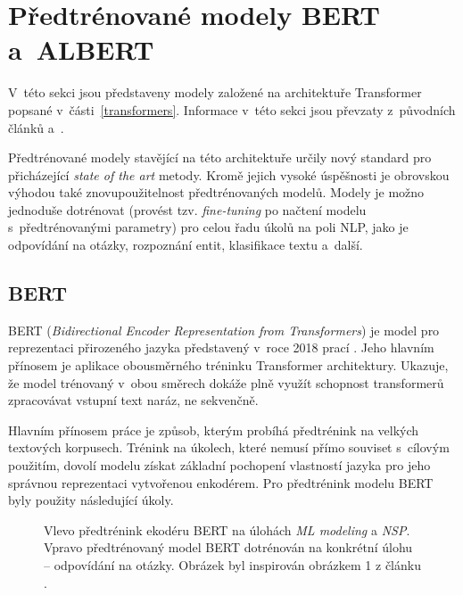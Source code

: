 \section{Předtrénované modely BERT a~ALBERT}
\label{bert_albert}

V~této sekci jsou představeny modely založené na architektuře Transformer popsané v~čás\-ti~\ref{transformers}. Informace v~této sekci jsou převzaty z~původních článků \cite{BERT} a~\cite{ALBERT}.\par
Předtrénované modely stavějící na této architektuře určily nový standard pro přicházející \textit{state of the art} metody. Kromě jejich vysoké úspěšnosti je obrovskou výhodou také znovupoužitelnost předtrénovaných modelů. Modely je možno jednoduše dotrénovat (provést tzv. \emph{fine-tuning} po načtení modelu s~předtrénovanými parametry) pro celou řadu úkolů na poli NLP, jako je odpovídání na otázky, rozpoznání entit, klasifikace textu a~další.

\subsection{BERT}
BERT (\textit{Bidirectional Encoder Representation from Transformers}) je model pro reprezentaci přirozeného jazyka představený v~roce 2018 prací \cite{BERT}. Jeho hlavním přínosem je aplikace obousměrného tréninku Transformer architektury. Ukazuje, že model trénovaný v~obou směrech dokáže plně využít schopnost transformerů zpracovávat vstupní text naráz, ne sekvenčně.\par\smallskip
Hlavním přínosem práce \cite{BERT} je způsob, kterým probíhá předtrénink na velkých textových korpusech. Trénink na úkolech, které nemusí přímo souviset s~cílovým použitím, dovolí modelu získat základní pochopení vlastností jazyka pro jeho správnou reprezentaci vytvořenou enkodérem. Pro předtrénink modelu BERT byly použity následující úkoly.

\begin{figure}[hbt]
	\centering
	\caption{Vlevo předtrénink ekodéru BERT na úlohách \emph{ML modeling} a \emph{NSP}. Vpravo předtrénovaný model BERT dotrénován na konkrétní úlohu -- odpovídání na otázky. Obrázek byl inspirován obrázkem 1 z článku \cite{BERT}.}
	\label{bert}
\end{figure}

